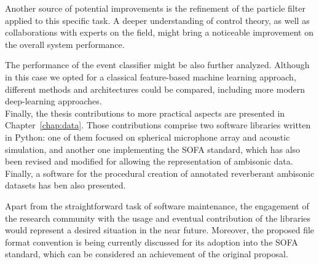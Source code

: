 Another source of potential improvements is the refinement of the particle filter applied to this specific task. A deeper understanding of control theory, as well as collaborations with experts on the field, might bring a noticeable improvement on the overall system performance.

The performance of the event classifier might be also further analyzed. Although in this case we opted for a classical feature-based machine learning approach, different methods and architectures could be compared, including more modern deep-learning approaches.\\

Finally, the thesis contributions to more practical aspects are presented in Chapter~\ref{chap:data}. Those contributions comprise two software libraries written in Python: one of them focused on spherical microphone array and acoustic simulation, and another one implementing the SOFA standard, which has also been revised and modified for allowing the representation of ambisonic data. Finally, a software for the procedural creation of annotated reverberant ambisonic datasets has ben also presented. 

Apart from the straightforward task of software maintenance, the engagement of the research community with the usage and eventual contribution of the libraries would represent a desired situation in the near future. Moreover, the proposed file format convention is being currently discussed for its adoption into the SOFA standard, which can be considered an achievement of the original proposal. 
 

